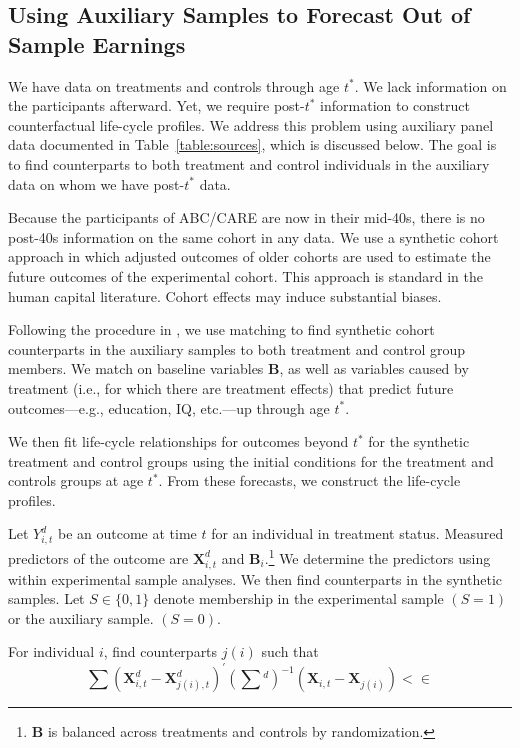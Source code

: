\subsection{Using Auxiliary Samples to Forecast Out of Sample Earnings}\label{sec:necrosis}

We have data on treatments and controls through age $t^{\ast}$. We lack information on the participants afterward. Yet, we require post-$t^{\ast}$ information to construct counterfactual life-cycle profiles. We address this problem using auxiliary panel data documented in Table~\ref{table:sources}, which is discussed below. The goal is to find counterparts to both treatment and control individuals in the auxiliary data on whom we have post-$t^{\ast}$ data.

Because the participants of ABC/CARE are now in their mid-40s, there is no post-40s information on the same cohort  in any data. We use a synthetic cohort approach in which adjusted outcomes of older cohorts are used to estimate the future outcomes of the experimental cohort. This approach is standard in the human capital literature. Cohort effects may induce substantial biases.

Following the procedure in \citet{Heckman_Ichimura_etal_1998_REStud}, we use matching to find synthetic cohort counterparts in the auxiliary samples to both treatment and control group members. We match on baseline variables $\bm{B}$, as well as variables caused by treatment (i.e., for which there are treatment effects) that predict future outcomes---e.g., education, IQ, etc.---up through age $t^{\ast}$.

We then fit life-cycle relationships for outcomes beyond $t^{\ast}$ for the synthetic treatment and control groups using the initial conditions for the treatment and controls groups at age $t^{\ast}$. From these forecasts, we construct the life-cycle profiles.

Let $Y^{d}_{i,t}$ be an outcome at time $t$ for an individual in treatment status. Measured predictors of the outcome are $\bm{X}^{d}_{i,t}$ and $\bm{B}_i$.\footnote{$\bm{B}$ is balanced across treatments and controls by randomization.} We determine the predictors using within experimental sample analyses. We then find counterparts in the synthetic samples. Let $S \in \{ 0,1\}$ denote membership in the experimental sample $(S=1)$ or the auxiliary sample. $(S=0)$.

For individual $i$, find counterparts $j(i)$ such that
\begin{equation}\label{eq:ingrownnail}
\sum (\bm{X}^{d}_{i,t} - \bm{X}^{d}_{j(i),t})^{\prime} {(\bm{\sum}{^d})}^{-1} (\bm{X}_{i,t} - \bm{X}_{j(i)}) < \in
\end{equation}

